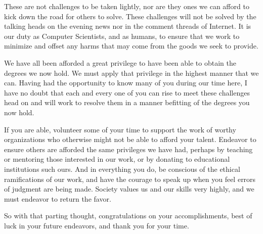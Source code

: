 \documentclass[11pt,twocolumn,letterpaper]{article}
\begin{document}
These are not challenges to be taken lightly, nor are they ones we can
afford to kick down the road for others to solve. These challenges
will not be solved by the talking heads on the evening news nor in the
comment threads of Internet. It is our duty as Computer Scientists,
and as humans, to ensure that we work to minimize and offset any harms
that may come from the goods we seek to provide.

We have all been afforded a great privilege to have been able to
obtain the degrees we now hold. We must apply that privilege in the
highest manner that we can. Having had the opportunity to know many of
you during our time here, I have no doubt that each and every one of
you can rise to meet these challenges head on and will work to resolve
them in a manner befitting of the degrees you now hold.

If you are able, volunteer some of your time to support the work of
worthy organizations who otherwise might not be able to afford your
talent. Endeavor to ensure others are afforded the same privileges we
have had, perhaps by teaching or mentoring those interested in our
work, or by donating to educational institutions such ours. And in
everything you do, be conscious of the ethical ramifications of our
work, and have the courage to speak up when you feel errors of
judgment are being made. Society values us and our skills very highly,
and we must endeavor to return the favor.

So with that parting thought, congratulations on your accomplishments,
best of luck in your future endeavors, and thank you for your time.
\end{document}
